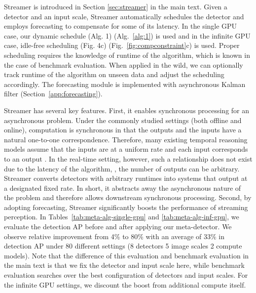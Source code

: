 Streamer is introduced in Section
\else
    \ref{sec:streamer}
\fi
in the main text. Given a detector and an input scale, Streamer automatically schedules the detector and employs forecasting to compensate for some of its latency. In the single GPU case, our dynamic schedule
\ifstandalonesupplement
    (Alg. 1)
\else
    (Alg.~\ref{alg:1})
\fi
is used and in the infinite GPU case, idle-free scheduling
\ifstandalonesupplement
    (Fig. 4c)
\else
    (Fig.~\ref{fig:compconstraint}c)
\fi
is used. Proper scheduling requires the knowledge of runtime of the algorithm, which is known in the case of benchmark evaluation. When applied in the wild, we can optionally track runtime of the algorithm on unseen data and adjust the scheduling accordingly. The forecasting module is implemented with asynchronous Kalman filter (Section~\ref{app:forecasting}).

Streamer has several key features. First, it enables synchronous processing for an asynchronous problem. Under the commonly studied settings (both offline and online), computation is synchronous in that the outputs and the inputs have a natural one-to-one correspondence. Therefore, many existing temporal reasoning models assume that the inputs are at a uniform rate and each input corresponds to an output \cite{Donahue2015LongtermRC,Girdhar2018ABB,Feichtenhofer2019SlowFastNF}. In the real-time setting, however, such a relationship does not exist due to the latency of the algorithm, \ie, the number of outputs can be arbitrary. Streamer converts detectors with arbitrary runtimes into systems that output at a designated fixed rate. In short, it abstracts away the asynchronous nature of the problem and therefore allows downstream synchronous processing. Second, by adopting forecasting, Streamer significantly boosts the performance of streaming perception. In Tables~\ref{tab:meta-alg-single-gpu} and \ref{tab:meta-alg-inf-gpu}, we evaluate the detection AP before and after applying our meta-detector. We observe relative improvement from 4\% to 80\% with an average of 33\% in detection AP under 80 different settings (8 detectors  5 image scales  2 compute models). Note that the difference of this evaluation and benchmark evaluation in the main text is that we fix the detector and input scale here, while benchmark evaluation searches over the best configuration of detectors and input scales. For the infinite GPU settings, we discount the boost from additional compute itself.











